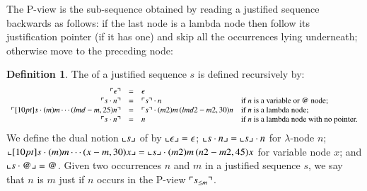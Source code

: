 \documentclass{elsarticle}
\theoremstyle{plain}
\theoremstyle{definition}
\newtheorem{definition}{Definition}[section]
\begin{document}
The P-view is the sub-sequence obtained by reading a justified sequence backwards as follows: if the last node is a lambda node then follow its justification pointer (if it has one) and skip all the occurrences lying underneath; otherwise move to the preceding node:
\begin{definition}
\label{def:views}
The  of a justified sequence $s$ is defined recursively by:
$$\begin{array}{rcll}
 \pview{\epsilon} &=&  \epsilon \\
 \pview{s \cdot n }  &=&  \pview{s} \cdot n
    & \mbox{if $n$ is a variable or $@$ node;}
    \\
 \pview{\Pstr[10pt]{ s \cdot (m){m} \cdots (lmd-m,25){n}}} &=&
        \Pstr{ \pview{s} \cdot (m2){m} \, (lmd2-m2,30){n} }
    & \mbox{if $n$ is a lambda node;}
    \\
 \pview{s \cdot n }  &=&  n & \mbox{if $n$ is a lambda node with no pointer.}
\end{array}$$
%
We define the dual notion $\llcorner s \lrcorner$ of  by
$\llcorner \epsilon \lrcorner = \epsilon$;
$\llcorner s \cdot n  \lrcorner  =  \llcorner s \lrcorner \cdot n$ for $\lambda$-node $n$;
$\oview{\Pstr[10pt]{s \cdot (m){m} \cdots (x-m,30){x}}}= \Pstr{ \oview{s} \cdot (m2){m} \, (n2-m2,45){x} }$ for variable node $x$; and $\llcorner s \cdot @  \lrcorner = @$.
%
%
Given two occurrences $n$ and $m$ in a justified sequence $s$, we say that $n$ is  $m$ just if $n$ occurs in the P-view $\ulcorner s_{\leq m} \urcorner$.
\end{definition}

\end{document}
